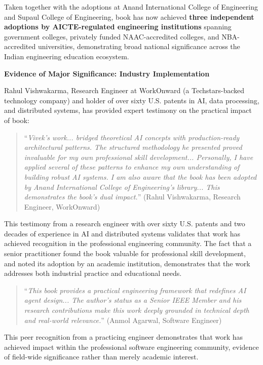 Taken together with the adoptions at Anand International College of Engineering and Supaul College of Engineering, \drs book has now achieved \textbf{three independent adoptions by AICTE-regulated engineering institutions} spanning government colleges, privately funded NAAC-accredited colleges, and NBA-accredited universities, demonstrating broad national significance across the Indian engineering education ecosystem.

\textbf{Evidence of Major Significance: Industry Implementation}

Rahul Vishwakarma, Research Engineer at WorkOnward (a Techstars-backed technology company) and holder of over sixty U.S. patents in AI, data processing, and distributed systems, has provided expert testimony on the practical impact of \drs book:

\begin{quote}
``\textit{Vivek's work... bridged theoretical AI concepts with production-ready architectural patterns. The structured methodology he presented proved invaluable for my own professional skill development... Personally, I have applied several of these patterns to enhance my own understanding of building robust AI systems. I am also aware that the book has been adopted by Anand International College of Engineering's library... This demonstrates the book's dual impact.}'' (Rahul Vishwakarma, Research Engineer, WorkOnward) \cite{RV1}
\end{quote}

This testimony from a research engineer with over sixty U.S. patents and two decades of experience in AI and distributed systems validates that \drs work has achieved recognition in the professional engineering community. The fact that a senior practitioner found the book valuable for professional skill development, and noted its adoption by an academic institution, demonstrates that the work addresses both industrial practice and educational needs.

\begin{quote}
``\textit{This book provides a practical engineering framework that redefines AI agent design... The author's status as a Senior IEEE Member and his research contributions make this work deeply grounded in technical depth and real-world relevance.}'' (Anmol Agarwal, Software Engineer) \cite{OR3}
\end{quote}

This peer recognition from a practicing engineer demonstrates that \drs work has achieved impact within the professional software engineering community, evidence of field-wide significance rather than merely academic interest.

